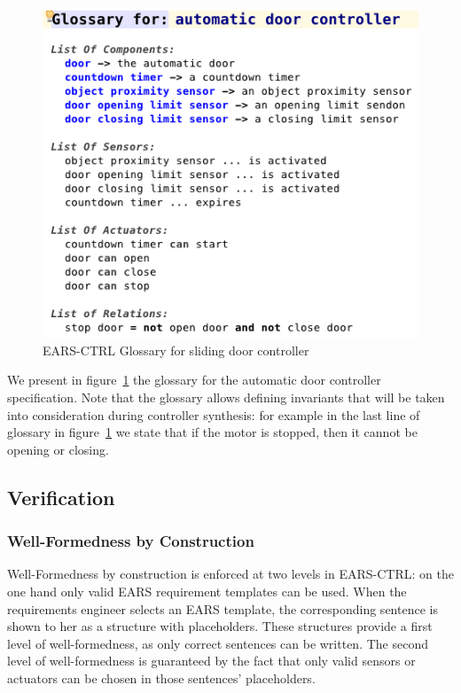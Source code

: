 \begin{figure}[h!]
   \begin{center}
     \includegraphics[width=.5\textwidth]{images/glossary.png}
     \caption{\textsf{EARS-CTRL} Glossary for sliding door controller}
     \label{fig:ears_glossary}
   \end{center}
 \end{figure}
 
 We present in figure~\ref{fig:ears_glossary} the glossary for the automatic
 door controller specification. Note that the glossary allows defining
 invariants that will be taken into consideration during controller synthesis:
 for example in the last line of glossary in figure~\ref{fig:ears_glossary} we
 state that if the motor is \textsf{stopped}, then it cannot be
 \textsf{opening} or \textsf{closing}.

\subsection{Verification}


\subsubsection{Well-Formedness by Construction}

Well-Formedness by construction is enforced at two levels in \textsf{EARS-CTRL}:
on the one hand only valid EARS requirement templates can be used. When the
requirements engineer selects an EARS template, the corresponding sentence is
shown to her as a structure with placeholders. These structures provide a
first level of well-formedness, as only correct sentences can be written. The
second level of well-formedness is guaranteed by the fact that only valid
sensors or actuators can be chosen in those sentences' placeholders. 

